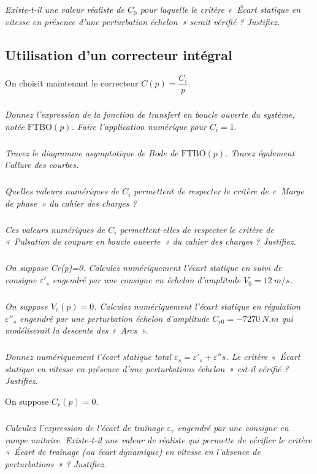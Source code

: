 \documentclass[10pt,fleqn]{article} %
\begin{document}
\subparagraph{}
\textit{Existe-t-il une valeur réaliste de $C_0$ pour laquelle le critère «~Écart statique en vitesse en présence d’une perturbation échelon~» serait vérifié ? Justifiez.}


\subsection{Utilisation d'un correcteur intégral}

On choisit maintenant le correcteur $C(p)=\dfrac{C_i}{p}$.

\subparagraph{}
\textit{Donnez l’expression de la fonction de transfert en boucle ouverte du système, notée $\text{FTBO}(p)$. Faire l’application numérique pour $C_i=1$.}

\subparagraph{}
\textit{Tracez le diagramme asymptotique de Bode de $\text{FTBO}(p)$. Tracez également l’allure des courbes.}

\subparagraph{}
\textit{Quelles valeurs numériques de $C_i$ permettent de respecter le critère de «~Marge de phase~» du cahier des charges ?}

\subparagraph{}
\textit{Ces valeurs numériques de $C_i$ permettent-elles de respecter le critère de «~Pulsation de coupure en boucle ouverte~» du cahier des charges ? Justifiez.}

\subparagraph{}
\textit{On suppose Cr(p)=0. Calculez numériquement l’écart statique en suivi de consigne $\varepsilon'_s$ engendré par une consigne en échelon d’amplitude $V_0=\SI{12}{m/s}$.}

\subparagraph{}
\textit{On suppose $V_c(p)=0$. Calculez numériquement l’écart statique en régulation $\varepsilon''_s$ engendré par une perturbation échelon d’amplitude $C_{r0}=\SI{-7270}{N.m}$ qui modéliserait la descente des «~Arcs~».}

\subparagraph{}
\textit{Donnez numériquement l’écart statique total $\varepsilon_s=\varepsilon'_s+ \varepsilon''s$. Le critère «~Écart statique en vitesse en présence d’une perturbations échelon~» est-il vérifié ? Justifiez.}

\vspace{.5cm}

On suppose $C_r(p)=0$.
\subparagraph{}
\textit{Calculez l’expression de l’écart de traînage $\varepsilon_v$ engendré par une consigne en rampe unitaire. Existe-t-il une valeur de   réaliste qui permette de vérifier le critère «~Écart de traînage (ou écart dynamique) en vitesse en l’absence de perturbations~» ? Justifiez.}
\end{document}
